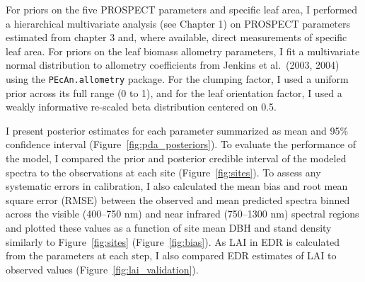 For priors on the five PROSPECT parameters and specific leaf area, I performed a hierarchical multivariate analysis (see Chapter 1) on PROSPECT parameters estimated from chapter 3 and, where available, direct measurements of specific leaf area. 
For priors on the leaf biomass allometry parameters, I fit a multivariate normal distribution to allometry coefficients from Jenkins et al.~(2003, 2004) using the \texttt{PEcAn.allometry} package. \nocite{jenkins_2003_allom,jenkins_2004_allom} 
For the clumping factor, I used a uniform prior across its full range (0 to 1), and for the leaf orientation factor, I used a weakly informative re-scaled beta distribution centered on 0.5.

I present posterior estimates for each parameter summarized as mean and 95\% confidence interval (Figure~\ref{fig:pda_posteriors}).
To evaluate the performance of the model, I compared the prior and posterior credible interval of the modeled spectra to the observations at each site (Figure~\ref{fig:sites}).
% 
% 
To assess any systematic errors in calibration, I also calculated the mean bias and root mean square error (RMSE) between the observed and mean predicted spectra binned across the visible (400--750 nm) and near infrared (750--1300 nm) spectral regions and plotted these values as a function of site mean DBH and stand density similarly to Figure~\ref{fig:sites} (Figure~\ref{fig:bias}).
As LAI in EDR is calculated from the parameters at each step, I also compared EDR estimates of LAI to observed values (Figure~\ref{fig:lai_validation}). %


